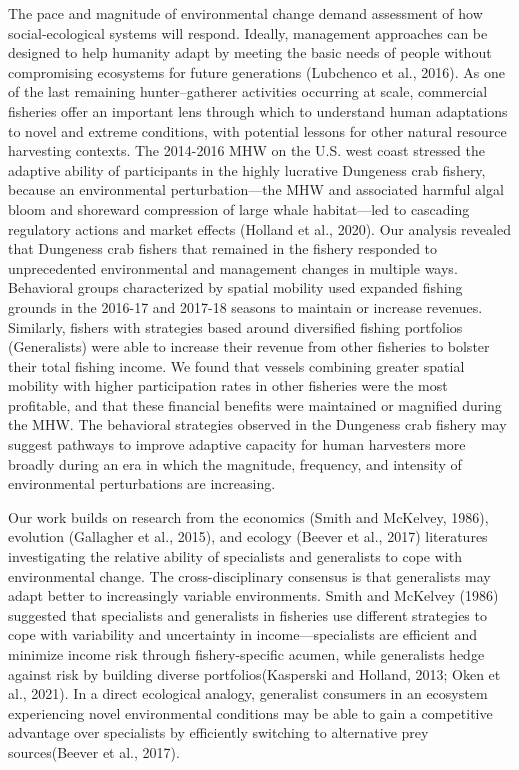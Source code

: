 \documentclass[]{elsarticle} %
\begin{document}
The pace and magnitude of environmental change demand assessment of how
social-ecological systems will respond. Ideally, management approaches
can be designed to help humanity adapt by meeting the basic needs of
people without compromising ecosystems for future generations (Lubchenco
et al., 2016). As one of the last remaining hunter--gatherer activities
occurring at scale, commercial fisheries offer an important lens through
which to understand human adaptations to novel and extreme conditions,
with potential lessons for other natural resource harvesting contexts.
The 2014-2016 MHW on the U.S. west coast stressed the adaptive ability
of participants in the highly lucrative Dungeness crab fishery, because
an environmental perturbation---the MHW and associated harmful algal
bloom and shoreward compression of large whale habitat---led to
cascading regulatory actions and market effects (Holland et al., 2020).
Our analysis revealed that Dungeness crab fishers that remained in the
fishery responded to unprecedented environmental and management changes
in multiple ways. Behavioral groups characterized by spatial mobility
used expanded fishing grounds in the 2016-17 and 2017-18 seasons to
maintain or increase revenues. Similarly, fishers with strategies based
around diversified fishing portfolios (Generalists) were able to
increase their revenue from other fisheries to bolster their total
fishing income. We found that vessels combining greater spatial mobility
with higher participation rates in other fisheries were the most
profitable, and that these financial benefits were maintained or
magnified during the MHW. The behavioral strategies observed in the
Dungeness crab fishery may suggest pathways to improve adaptive capacity
for human harvesters more broadly during an era in which the magnitude,
frequency, and intensity of environmental perturbations are increasing.

Our work builds on research from the economics (Smith and McKelvey,
1986), evolution (Gallagher et al., 2015), and ecology (Beever et al.,
2017) literatures investigating the relative ability of specialists and
generalists to cope with environmental change. The cross-disciplinary
consensus is that generalists may adapt better to increasingly variable
environments. Smith and McKelvey (1986) suggested that specialists and
generalists in fisheries use different strategies to cope with
variability and uncertainty in income---specialists are efficient and
minimize income risk through fishery-specific acumen, while generalists
hedge against risk by building diverse portfolios(Kasperski and Holland,
2013; Oken et al., 2021). In a direct ecological analogy, generalist
consumers in an ecosystem experiencing novel environmental conditions
may be able to gain a competitive advantage over specialists by
efficiently switching to alternative prey sources(Beever et al., 2017).
\end{document}
